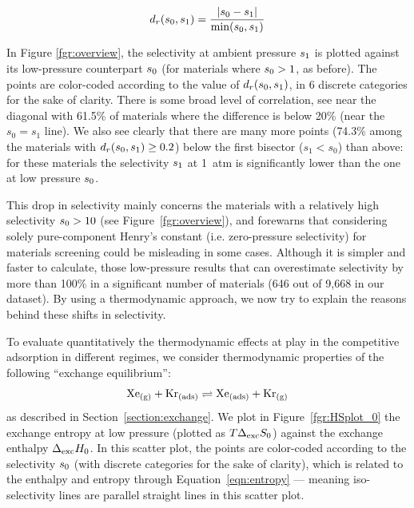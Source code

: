 \documentclass[main]{subfiles}
\begin{document}
  \begin{equation} \label{eqn:reldiff}
      d_r(s_{\text{0}},s_{\text{1}}) = \dfrac{\lvert s_{\text{0}} - s_{\text{1}} \rvert}{\min(s_{\text{0}},s_{\text{1}})}
  \end{equation}
  
  In Figure \ref{fgr:overview}, the selectivity at ambient pressure $s_{\text{1}}$ is plotted against its low-pressure counterpart $s_{\text{0}}$ (for materials where $s_{\text{0}} > 1$, as before). The points are color-coded according to the value of $d_r(s_{\text{0}},s_{\text{1}})$, in 6 discrete categories for the sake of clarity. There is some broad level of correlation, see near the diagonal with {61.5\%} of materials where the difference is below {20\%} (near the $s_0 = s_1$ line). We also see clearly that there are many more points ({74.3\%} among the materials with $d_r(s_{\text{0}},s_{\text{1}})\ge 0.2$) below the first bisector ($s_1 < s_0$) than above: for these materials the selectivity $s_{\text{1}}$ at 1~atm is significantly lower than the one at low pressure $s_{\text{0}}$.
  
  This drop in selectivity mainly concerns the materials with a relatively high selectivity $s_{\text{0}} > 10$ (see Figure~\ref{fgr:overview}), and forewarns that considering solely pure-component Henry's constant (i.e. zero-pressure selectivity) for materials screening could be misleading in some cases. Although it is simpler and faster to calculate, those low-pressure results that can overestimate selectivity by more than {100\%} in a significant number of materials (646 out of 9,668 in our dataset). By using a thermodynamic approach, we now try to explain the reasons behind these shifts in selectivity.
  
  To evaluate quantitatively the thermodynamic effects at play in the competitive adsorption in different regimes, we consider thermodynamic properties of the following ``exchange equilibrium'':
  \[
      \text{Xe}_{\text{(g)}} + \text{Kr}_{\text{(ads)}}
      \rightleftharpoons \text{Xe}_{\text{(ads)}} + \text{Kr}_{\text{(g)}}
  \]
  as described in Section~\ref{section:exchange}. We plot in Figure~\ref{fgr:HSplot_0} the exchange entropy at low pressure (plotted as $T\Delta_{\text{exc}}S_{\text{0}}$) against the 
  exchange enthalpy $\Delta_{\text{exc}}H_{\text{0}}$. In this scatter plot, the points are color-coded according to the selectivity $s_{\text{0}}$ (with discrete categories for the sake of clarity), which is related to the enthalpy and entropy through Equation~\ref{eqn:entropy} --- meaning iso-selectivity lines are parallel straight lines in this scatter plot.
  
\end{document}
